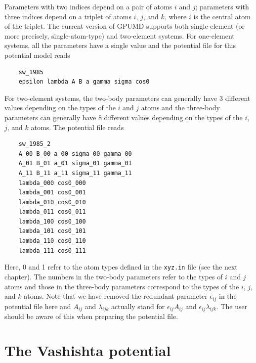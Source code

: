 \documentclass[12pt,a4paper]{report}
\begin{document}
Parameters with two indices depend on a pair of atoms $i$ and $j$; parameters with three indices depend on a triplet of atoms $i$, $j$, and $k$, where $i$ is the central atom of the triplet. The current version of GPUMD supports both single-element (or more precisely, single-atom-type) and two-element systems. For one-element systems, all the parameters have a single value and the potential file for this potential model reads
\begin{verbatim}
    sw_1985
    epsilon lambda A B a gamma sigma cos0
\end{verbatim}
For two-element systems, the two-body parameters can generally have 3 different values depending on the types of the $i$ and $j$ atoms and the three-body parameters can generally have 8 different values depending on the types of the $i$, $j$, and $k$ atoms. The potential file reads
\begin{verbatim}
    sw_1985_2
    A_00 B_00 a_00 sigma_00 gamma_00
    A_01 B_01 a_01 sigma_01 gamma_01
    A_11 B_11 a_11 sigma_11 gamma_11
    lambda_000 cos0_000
    lambda_001 cos0_001
    lambda_010 cos0_010
    lambda_011 cos0_011
    lambda_100 cos0_100
    lambda_101 cos0_101
    lambda_110 cos0_110
    lambda_111 cos0_111
\end{verbatim}
Here, 0 and 1 refer to the atom types defined in the \verb"xyz.in" file (see the next chapter). The numbers in the two-body parameters refer to the types of $i$ and $j$ atoms and those in the three-body parameters correspond to the types of the $i$, $j$, and $k$ atoms. Note that we have removed the redundant parameter $\epsilon_{ij}$ in the potential file here and $A_{ij}$ and $\lambda_{ijk}$ actually stand for $\epsilon_{ij}A_{ij}$ and $\epsilon_{ij}\lambda_{ijk}$. The user should be aware of this when preparing the potential file.



\section{The Vashishta potential}
\end{document}
